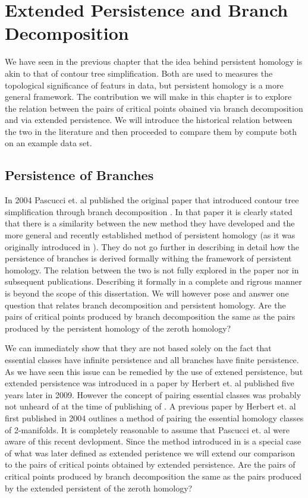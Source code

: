 \chapter{Extended Persistence and Branch Decomposition}
\label{chapter6}

We have seen in the previous chapter that the idea behind persistent homology is akin to that of contour tree simplification. Both are used to measures the topological significance of featurs in data, but persistent homology is a more general framework. The contribution we will make in this chapter is to explore the relation between the pairs of critical points obained via branch decomposition and via extended persistence. We will introduce the historical relation between the two in the literature and then proceeded to compare them by compute both on an example data set.

\section{Persistence of Branches}

In 2004 Pascucci et. al published the original paper that introduced contour tree simplification through branch decomposition \cite{ct-branch-decomp}. In that paper it is clearly stated that there is a similarity between the new method they have developed and the more general and recently established method of persistent homology (as it was originally introduced in \cite{persistence-original}). They do not go further in describing in detail how the persistence of branches is derived formally withing the framework of persistent homology. The relation between the two is not fully explored in the paper nor in subsequent publications. Describing it formally in a complete and rigrous manner is beyond the scope of this dissertation. We will however pose and answer one question that relates branch decomposition and persistent homology. Are the pairs of critical points produced by branch decomposition the same as the pairs produced by the persistent homology of the zeroth homology?

We can immediately show that they are not based solely on the fact that essential classes have infinite persistence and all branches have finite persistence. As we have seen this issue can be remedied by the use of extened persistence, but extended persistence was introduced in a paper by Herbert et. al \cite{persistence-extended} published five years later in 2009. However the concept of pairing essential classes was probably not unheard of at the time of publishing of \cite{ct-branch-decomp}. A previous paper \cite{extreme-elevation} by Herbert et. al first published in 2004 outlines a method of pairing the essential homology classes of 2-manifolds. It is completely reasonable to assume that Pascucci et. al were aware of this recent devlopment. Since the method introduced in \cite{extreme-elevation} is a special case of what was later defined as extended peristence we will extend our comparison to the pairs of critical points obtained by extended persistence. Are the pairs of critical points produced by branch decomposition the same as the pairs produced by the extended persistent of the zeroth homology?

